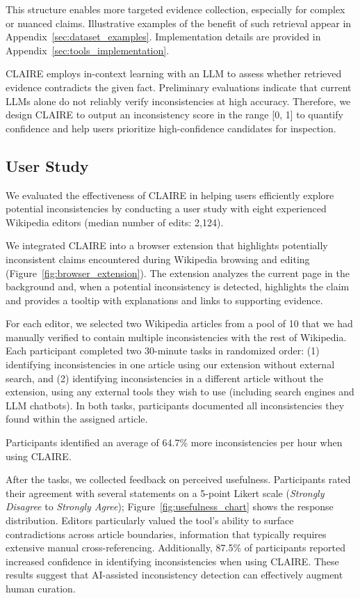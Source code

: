\documentclass[11pt]{article}
\newcommand{\system}[0]{\textsc{CLAIRE}\xspace}
\begin{document}
This structure enables more targeted evidence collection, especially for complex or nuanced claims. Illustrative examples of the benefit of such retrieval appear in Appendix~\ref{sec:dataset_examples}. Implementation details are provided in Appendix~\ref{sec:tools_implementation}.

\system employs in-context learning with an LLM to assess whether retrieved evidence contradicts the given fact. Preliminary evaluations indicate that current LLMs alone do not reliably verify inconsistencies at high accuracy. Therefore, we design \system to output an inconsistency score in the range [0, 1] to quantify confidence and help users prioritize high-confidence candidates for inspection.

\subsection{User Study}
We evaluated the effectiveness of \system in helping users efficiently explore potential inconsistencies by conducting a user study with eight experienced Wikipedia editors (median number of edits: 2{,}124).

We integrated \system into a browser extension that highlights potentially inconsistent claims encountered during Wikipedia browsing and editing (Figure~\ref{fig:browser_extension}). The extension analyzes the current page in the background and, when a potential inconsistency is detected, highlights the claim and provides a tooltip with explanations and links to supporting evidence.

For each editor, we selected two Wikipedia articles from a pool of 10 that we had manually verified to contain multiple inconsistencies with the rest of Wikipedia. Each participant completed two 30-minute tasks in randomized order: (1) identifying inconsistencies in one article using our extension without external search, and (2) identifying inconsistencies in a different article without the extension, using any external tools they wish to use (including search engines and LLM chatbots). In both tasks, participants documented all inconsistencies they found within the assigned article.

Participants identified an average of 64.7\% more inconsistencies per hour when using \system.

After the tasks, we collected feedback on perceived usefulness. Participants rated their agreement with several statements on a 5-point Likert scale (\textit{Strongly Disagree} to \textit{Strongly Agree}); Figure~\ref{fig:usefulness_chart} shows the response distribution. Editors particularly valued the tool's ability to surface contradictions across article boundaries, information that typically requires extensive manual cross-referencing. Additionally, 87.5\% of participants reported increased confidence in identifying inconsistencies when using \system. These results suggest that AI-assisted inconsistency detection can effectively augment human curation.
\end{document}
